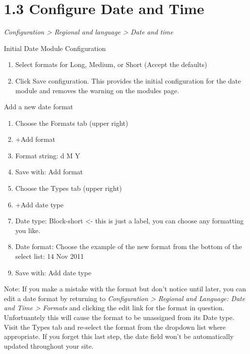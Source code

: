 \documentclass[letterpaper,10pt,english]{sphinxmanual}
\begin{document}
\section{1.3 Configure Date and Time}
\label{event_calendar:configure-date-and-time}
\emph{Configuration \textgreater{} Regional and language \textgreater{} Date and time}

Initial Date Module Configuration
\begin{enumerate}
\item {} 
Select formats for Long, Medium, or Short (Accept the defaults)

\item {} 
Click Save configuration. This provides the initial configuration for the date module and removes the warning on the modules page.

\end{enumerate}

Add a new date format
\begin{enumerate}
\item {} 
Choose the Formats tab (upper right)

\item {} 
+Add format

\item {} 
Format string: d M Y

\item {} 
Save with: Add format

\item {} 
Choose the Types tab (upper right)

\item {} 
+Add date type

\item {} 
Date type: Block-short \textless{}- this is just a label, you can choose any formatting you like.

\item {} 
Date format: Choose the example of the new format from the bottom of the select list: 14 Nov 2011

\item {} 
Save with: Add date type

\end{enumerate}

Note: If you make a mistake with the format but don't notice until later, you can edit a date format by returning to \emph{Configuration \textgreater{} Regional and Language: Date and Time \textgreater{} Formats} and clicking the edit link for the format in question. Unfortuantely this will cause the format to be unassigned from its Date type. Visit the Types tab and re-select the format from the dropdown list where appropriate.  If you forget this last step, the date field won't be automatically updated throughout your site.
\end{document}
